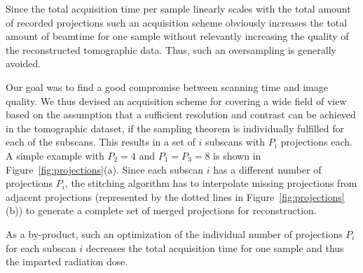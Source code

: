 \documentclass[preprint,s]{iucr}
\begin{document}
Since the total acquisition time per sample linearly scales with the total amount of recorded projections such an acquisition scheme obviously increases the total amount of beamtime for one sample without relevantly increasing the quality of the reconstructed tomographic data. Thus, such an oversampling is generally avoided.

Our goal was to find a good compromise between scanning time and image quality. We thus devised an acquisition scheme for covering a wide field of view based on the assumption that a sufficient resolution and contrast can be achieved in the tomographic dataset, if the sampling theorem is individually fulfilled for each of the subscans. This results in a set of $i$ subscans with $P_{i}$ projections each. A simple example with $P_{2}=4$ and $P_{1}=P_{3}=8$ is shown in Figure~\ref{fig:projections}(a). Since each subscan $i$ has a different number of projections $P_{i}$, the stitching algorithm has to interpolate missing projections from adjacent projections (represented by the dotted lines in Figure~\ref{fig:projections}(b)) to generate a complete set of merged projections for reconstruction.

As a by-product, such an optimization of the individual number of projections $P_{i}$ for each subscan $i$ decreases the total acquisition time for one sample and thus the imparted radiation dose.
\end{document}
